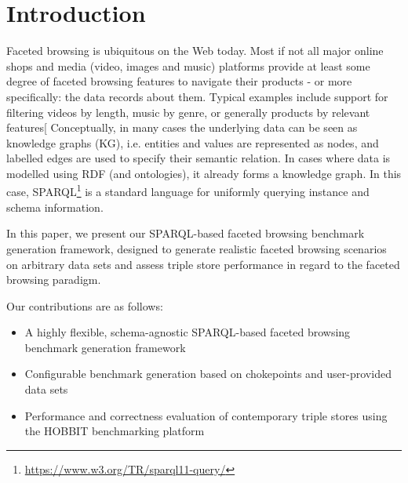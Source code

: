 
\section{Introduction}
Faceted browsing is ubiquitous on the Web today. Most if not all major online shops and media (video, images and music) platforms provide at least some degree of faceted browsing features to
navigate their products - or more specifically: the data records about them. Typical examples include support for filtering videos by length, music by genre, or generally products by relevant features[
Conceptually, in many cases the underlying data can be seen as knowledge graphs (KG), i.e. entities and values are represented as nodes, and labelled edges are used to specify their semantic relation. In cases where data is modelled using RDF (and ontologies), it already forms a knowledge graph. In this case, SPARQL\footnote{\url{https://www.w3.org/TR/sparql11-query/}} is a standard language for uniformly querying instance and schema information.

In this paper, we present our SPARQL-based faceted browsing benchmark generation framework, designed to generate realistic faceted browsing scenarios on arbitrary data sets and assess triple store performance in regard to the faceted browsing paradigm.

Our contributions are as follows:
\begin{itemize}
    \item A highly flexible, schema-agnostic SPARQL-based faceted browsing benchmark generation framework
    \item Configurable benchmark generation based on chokepoints and user-provided data sets
    \item Performance and correctness evaluation of contemporary triple stores using the HOBBIT benchmarking platform
\end{itemize}

